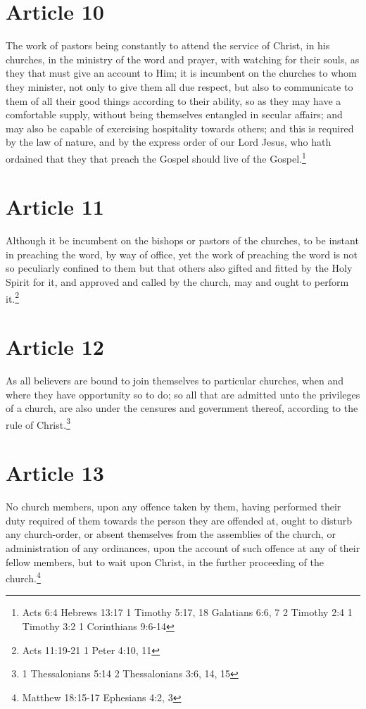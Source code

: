 \documentclass[12pt,letterpaper]{book}
\begin{document}
\section{Article 10}

The work of pastors being constantly to attend the service of Christ, in his churches, in the ministry of the word and prayer, with watching for their souls, as they that must give an account to Him; it is incumbent on the churches to whom they minister, not only to give them all due respect, but also to communicate to them of all their good things according to their ability, so as they may have a comfortable supply, without being themselves entangled in secular affairs; and may also be capable of exercising hospitality towards others; and this is required by the law of nature, and by the express order of our Lord Jesus, who hath ordained that they that preach the Gospel should live of the Gospel.\footnote{Acts 6:4 Hebrews 13:17 1 Timothy 5:17, 18 Galatians 6:6, 7 2 Timothy 2:4 1 Timothy 3:2 1 Corinthians 9:6-14}

\section{Article 11}

Although it be incumbent on the bishops or pastors of the churches, to be instant in preaching the word, by way of office, yet the work of preaching the word is not so peculiarly confined to them but that others also gifted and fitted by the Holy Spirit for it, and approved and called by the church, may and ought to perform it.\footnote{Acts 11:19-21 1 Peter 4:10, 11}

\section{Article 12}

As all believers are bound to join themselves to particular churches, when and where they have opportunity so to do; so all that are admitted unto the privileges of a church, are also under the censures and government thereof, according to the rule of Christ.\footnote{1 Thessalonians 5:14 2 Thessalonians 3:6, 14, 15}

\section{Article 13}

No church members, upon any offence taken by them, having performed their duty required of them towards the person they are offended at, ought to disturb any church-order, or absent themselves from the assemblies of the church, or administration of any ordinances, upon the account of such offence at any of their fellow members, but to wait upon Christ, in the further proceeding of the church.\footnote{Matthew 18:15-17 Ephesians 4:2, 3}
\end{document}
